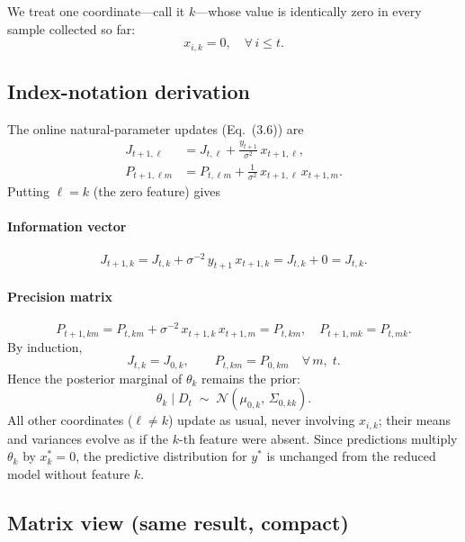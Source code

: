 \documentclass[11pt]{article}
\begin{document}
We treat one coordinate—call it $k$—whose value is identically zero in every sample collected so far:
\[
x_{i,k} = 0,\quad \forall\,i \le t.
\]

\subsection{Index-notation derivation}

The online natural-parameter updates (Eq.~(3.6)) are
\begin{align}
J_{t+1,\ell}
&= J_{t,\ell} + \frac{y_{t+1}}{\sigma^2}\,x_{t+1,\ell}, 
\label{eq:J-update}\\
P_{t+1,\ell m}
&= P_{t,\ell m} + \frac{1}{\sigma^2}\,x_{t+1,\ell}\,x_{t+1,m}.
\label{eq:P-update}
\end{align}
Putting $\ell = k$ (the zero feature) gives

\paragraph{Information vector}
\[
J_{t+1,k}
= J_{t,k} + \sigma^{-2}\,y_{t+1}\,x_{t+1,k}
= J_{t,k} + 0
= J_{t,k}.
\]

\paragraph{Precision matrix}
\[
P_{t+1,k m}
= P_{t,k m} + \sigma^{-2}\,x_{t+1,k}\,x_{t+1,m}
= P_{t,k m},
\quad
P_{t+1,m k}
= P_{t,m k}.
\]
By induction,
\[
J_{t,k} = J_{0,k}, 
\qquad
P_{t,k m} = P_{0,k m}
\quad\forall\,m,\;t.
\]
Hence the posterior marginal of $\theta_k$ remains the prior:
\[
\theta_k \mid D_t \;\sim\; \mathcal{N}(\mu_{0,k},\,\Sigma_{0,kk}).
\]
All other coordinates ($\ell \neq k$) update as usual, never involving $x_{i,k}$; their means and variances evolve as if the $k$-th feature were absent. Since predictions multiply $\theta_k$ by $x^*_k=0$, the predictive distribution for $y^*$ is unchanged from the reduced model without feature $k$.

\subsection{Matrix view (same result, compact)}
\end{document}
